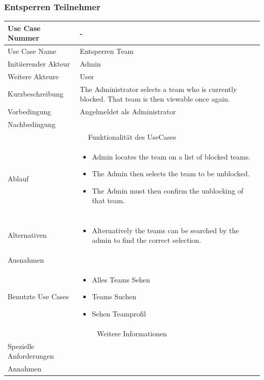 \documentclass[10pt,a4paper]{article}
\begin{document}
	\subsubsection{Entsperren Teilnehmer}
	\begin{tabular}{|l|p{.5\linewidth}|}
	\hline Use Case Nummer & - \\ 
	\hline Use Case Name & Entsperren Team \\ 
	\hline Initiierender Akteur & Admin \\
	\hline Weitere Akteure & User \\
	\hline Kurzbeschreibung & The Administrator selects a team who is currently blocked. That team is then viewable once again. \\
	\hline Vorbedingung & Angelmeldet als Administrator \\
	\hline Nachbedingung &  \\
	\hline \multicolumn{2}{|c|}{Funktionalität des UseCases}\\
	\hline Ablauf & \begin{itemize}
			\item Admin locates the team on a list of blocked teams.
			\item The Admin then selects the team to be unblocked.
			\item The Admin must then confirm the unblocking of that team.
		\end{itemize} \\ \\
	\hline Alternativen & \begin{itemize}
			\item Alternatively the teams can be searched by the admin to find the correct selection.
		\end{itemize} \\
	\hline Ausnahmen &  \\
	\hline Benutzte Use Cases & \begin{itemize}
			\item Alles Teams Sehen
			\item Teams Suchen
			\item Sehen Teamprofil
		\end{itemize} \\
	\hline \multicolumn{2}{|c|}{Weitere Informationen} \\
	\hline Spezielle Anforderungen &  \\
	\hline Annahmen &  \\
	\hline
	\end{tabular}
	
\end{document}
